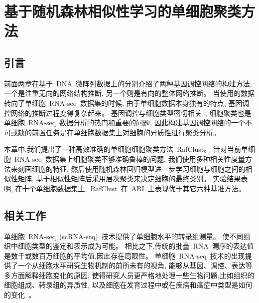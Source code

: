 \section{基于随机森林相似性学习的单细胞聚类方法}
\label{sec:rafclust}

\subsection{引言}

前面两章在基于~DNA~微阵列数据上的分别介绍了两种基因调控网络的构建方法,
一个是注重无向的网络结构推断, 另一个则是有向的整体网络推断。
当使用的数据转向了单细胞~RNA-seq~数据集的时候, 由于单细胞数据本身独有的特点, 基因调控网络的推断过程变得复杂起来。
基因调控与细胞类型密切相关~\cite{Hocker2020.09.11.291724,kang2020learning},
细胞聚类也是单细胞~RNA-seq~数据分析的热门和重要的问题, 
因此构建基因调控网络的一个不可或缺的前置任务是在单细胞数据集上对细胞的异质性进行聚类分析。

本章中,我们提出了一种高效准确的单细胞细胞聚类方法~RafClust。
针对当前单细胞~RNA-seq~数据集上细胞聚类不够准确鲁棒的问题,
我们使用多种相关性度量方法来刻画细胞的特征, 
然后使用随机森林回归模型进一步学习细胞与细胞之间的相似性矩阵,
基于相似性矩阵后采用层次聚类来决定细胞的最终类别。
实验结果表明, 在十个单细胞数据集上,~RafClust~在~ARI~上表现优于其它六种基准方法。

\subsection{相关工作}

单细胞~RNA-seq~(scRNA-seq)~技术提供了单细胞水平的转录组测量。
使不同组织中细胞类型的鉴定和表示成为可能。
相比之下,传统的批量~RNA~测序的表达值是数千或数百万细胞的平均值,因此存在局限性。
单细胞~RNA-seq~技术的出现提供了一个从细胞水平研究生物机制的前所未有的视角,
能够从基因、调控、表达等多方面解释细胞变化的原因,
使得研究人员更严格地处理一些生物问题,比如组织的细胞组成、转录组的异质性,
以及细胞在发育过程中或在疾病和癌症中类型是如何的变化~\cite{kumar2017understanding,patel2014single}。

